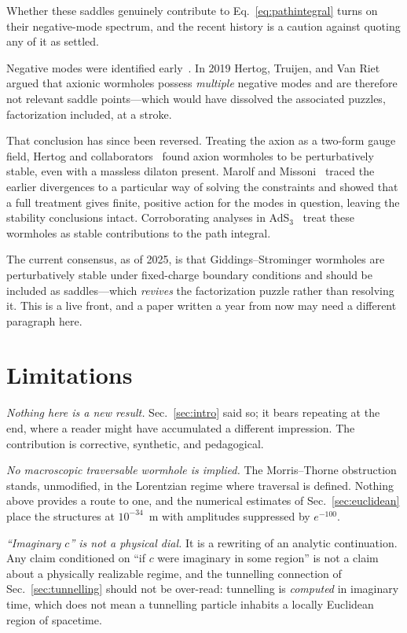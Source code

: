 \documentclass[twocolumn,floatfix,aps,prd,nofootinbib]{revtex4-2}
\begin{document}
Whether these saddles genuinely contribute to Eq.~\eqref{eq:pathintegral} turns on their negative-mode spectrum, and the recent history is a caution against quoting any of it as settled.

Negative modes were identified early~\cite{rubakov1987}. In 2019 Hertog, Truijen, and Van Riet~\cite{hertog2019} argued that axionic wormholes possess \emph{multiple} negative modes and are therefore not relevant saddle points---which would have dissolved the associated puzzles, factorization included, at a stroke.

That conclusion has since been reversed. Treating the axion as a two-form gauge field, Hertog and collaborators~\cite{hertog2024} found axion wormholes to be perturbatively stable, even with a massless dilaton present. Marolf and Missoni~\cite{marolf2025} traced the earlier divergences to a particular way of solving the constraints and showed that a full treatment gives finite, positive action for the modes in question, leaving the stability conclusions intact. Corroborating analyses in AdS$_3$~\cite{loveridge2025} treat these wormholes as stable contributions to the path integral.

The current consensus, as of 2025, is that Giddings--Strominger wormholes are perturbatively stable under fixed-charge boundary conditions and should be included as saddles---which \emph{revives} the factorization puzzle rather than resolving it. This is a live front, and a paper written a year from now may need a different paragraph here.

\section{Limitations}
\label{sec:limitations}

\emph{Nothing here is a new result.} Sec.~\ref{sec:intro} said so; it bears repeating at the end, where a reader might have accumulated a different impression. The contribution is corrective, synthetic, and pedagogical.

\emph{No macroscopic traversable wormhole is implied.} The Morris--Thorne obstruction stands, unmodified, in the Lorentzian regime where traversal is defined. Nothing above provides a route to one, and the numerical estimates of Sec.~\ref{sec:euclidean} place the structures at $10^{-34}$~m with amplitudes suppressed by $e^{-100}$.

\emph{``Imaginary $c$'' is not a physical dial.} It is a rewriting of an analytic continuation. Any claim conditioned on ``if $c$ were imaginary in some region'' is not a claim about a physically realizable regime, and the tunnelling connection of Sec.~\ref{sec:tunnelling} should not be over-read: tunnelling is \emph{computed} in imaginary time, which does not mean a tunnelling particle inhabits a locally Euclidean region of spacetime.
\end{document}
